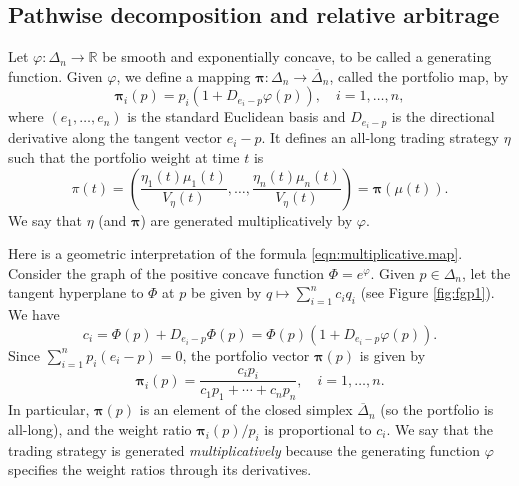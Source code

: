 \documentclass[graybox]{svmult}
\begin{document}
\subsection{Pathwise decomposition and relative arbitrage}
\begin{definition} \label{def:multiplicative.fgp}
Let $\varphi: \Delta_n \rightarrow \mathbb{R}$ be smooth and exponentially concave, to be called a generating function. Given $\varphi$, we define a mapping $\boldsymbol{\pi} : \Delta_n \rightarrow \overline{\Delta}_n$, called the portfolio map, by
\begin{equation} \label{eqn:multiplicative.map}
\boldsymbol{\pi}_i(p) = p_i \left(1 + D_{e_i - p} \varphi(p) \right), \quad i = 1, \ldots, n,
\end{equation}
where $(e_1, \ldots, e_n)$ is the standard Euclidean basis and $D_{e_i - p}$ is the directional derivative along the tangent vector $e_i - p$. It defines an all-long trading strategy $\eta$ such that the portfolio weight at time $t$ is 
\begin{equation} \label{eqn:multiplicative.portfolio}
\pi(t) = \left(\frac{\eta_1(t) \mu_1(t)}{V_{\eta}(t)}, \ldots, \frac{\eta_n(t) \mu_n(t)}{V_{\eta}(t)}\right) = \boldsymbol{\pi}(\mu(t)).
\end{equation}
We say that $\eta$ (and $\boldsymbol{\pi}$) are generated multiplicatively by $\varphi$.
\end{definition}

Here is a geometric interpretation of the formula \eqref{eqn:multiplicative.map}. Consider the graph of the positive concave function $\Phi = e^{\varphi}$. Given $p \in \Delta_n$, let the tangent hyperplane to $\Phi$ at $p$ be given by $q \mapsto \sum_{i = 1}^n c_i q_i$ (see Figure \ref{fig:fgp1}). We have
\[
c_i = \Phi(p) + D_{e_i - p} \Phi(p) = \Phi(p) \left(1 + D_{e_i - p} \varphi(p)\right).
\]
Since $\sum_{i = 1}^n p_i (e_i - p) = 0$, the portfolio vector $\boldsymbol{\pi}(p)$ is given by
\begin{equation} \label{eqn:multiplicative.portfolio.2}
\boldsymbol{\pi}_i(p) = \frac{c_i p_i}{c_1p_1 + \cdots + c_np_n}, \quad i = 1, \ldots, n.
\end{equation}
In particular, $\boldsymbol{\pi}(p)$ is an element of the closed simplex $\overline{\Delta}_n$ (so the portfolio is all-long), and the weight ratio $\boldsymbol{\pi}_i (p) / p_i$ is proportional to $c_i$. We say that the trading strategy is generated {\it multiplicatively} because the generating function $\varphi$ specifies the weight ratios through its derivatives.
\end{document}
